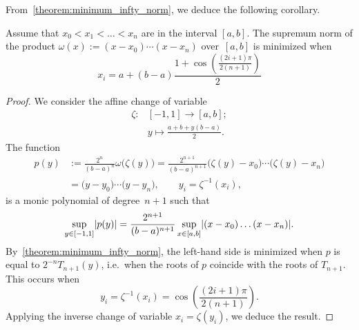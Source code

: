 From~\cref{theorem:minimum_infty_norm},
we deduce the following corollary.
\begin{corollary}
    \label{corollary:chebyshev_nodes}
    Assume that $x_0 < x_1 < \dotsc < x_n$ are in the interval $[a, b]$.
    The supremum norm of the product $\omega(x) := (x-x_0) \dotsb (x-x_n)$ over~$[a, b]$ is minimized when
    \begin{equation}
        x_i = a + (b-a) \frac{1 + \cos \left( \frac{(2i + 1) \pi}{2(n+1)} \right)}{2}
    \end{equation}
\end{corollary}
\begin{proof}
    We consider the affine change of variable
    \begin{align*}
        \zeta\colon &[-1, 1] \to [a, b]; \\
                    &y \mapsto \frac{a + b + y (b - a)}{2}.
    \end{align*}
    The function
    \begin{align*}
        p(y) &:= \frac{2^n}{(b-a)^n} \omega\bigl(\zeta(y)\bigr) = \frac{2^{n+1}}{(b-a)^{n+1}} \bigl(\zeta(y)-x_0\bigr) \dotsb \bigl(\zeta(y)-x_n\bigr) \\
             &= \bigl(y-y_0\bigr) \dotsb \bigl(y-y_n\bigr), \qquad y_i = \zeta^{-1}(x_i),
    \end{align*}
    is a monic polynomial of degree~$n+1$ such that
    \begin{equation}
        \label{eq:change_of_variable}
        \sup_{y \in [-1, 1]} \lvert p(y)\rvert = \frac{2^{n+1}}{(b-a)^{n+1}} \sup_{x \in [a, b]} \lvert(x-x_0) \dotsc (x - x_n)\rvert.
    \end{equation}
    By~\cref{theorem:minimum_infty_norm},
    the left-hand side is minimized when $p$ is equal to $2^{-n} T_{n+1}(y)$,
    i.e.\ when the roots of $p$ coincide with the roots of $T_{n+1}$.
    This occurs when
    \[
        y_i = \zeta^{-1}(x_i) = \cos \left( \frac{(2i + 1)\pi}{2 (n+1)} \right).
    \]
    Applying the inverse change of variable $x_i = \zeta(y_i)$,
    we deduce the result.
\end{proof}

